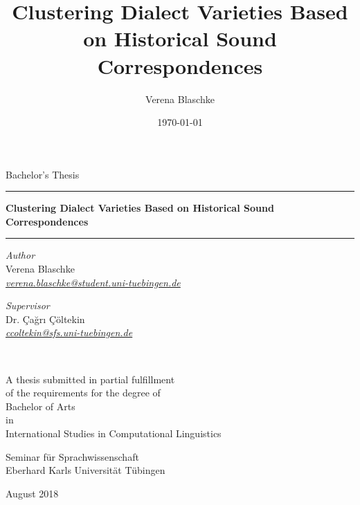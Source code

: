 \documentclass[a4paper]{article}
\title{Clustering Dialect Varieties Based on Historical Sound Correspondences}
\author{Verena Blaschke}
\date{\today}
\begin{document}
\begin{titlepage}
\begin{center}

\vspace*{.15\textheight}

{\Large Bachelor's Thesis}
\vspace{2em}

\hrule
\vspace{0.6cm}
{\huge\bfseries
Clustering Dialect Varieties Based on Historical Sound Correspondences
}\\[0.7cm] 
\hrule
\vspace*{.05\textheight}
 
\begin{minipage}[t]{0.4\textwidth}
\begin{flushleft} 
{\large
\textit{Author}\\
Verena Blaschke}\\
\href{mailto:verena.blaschke@student.uni-tuebingen.de}{\textit{verena.blaschke@student.uni-tuebingen.de}}\\
\end{flushleft}
\end{minipage}
\begin{minipage}[t]{0.4\textwidth}
\begin{flushright}
{\large
\textit{Supervisor}\\
Dr. Çağrı Çöltekin}\\
\href{mailto:ccoltekin@sfs.uni-tuebingen.de}{\textit{ccoltekin@sfs.uni-tuebingen.de}}\\
\end{flushright}
\end{minipage}\\

\vfill

A thesis submitted in partial fulfillment\\
of the requirements for the degree of\\[2mm]
{\large Bachelor of Arts}\\
in\\[1mm]
{\large International Studies in Computational Linguistics}

\vspace*{.1\textheight}

{\large Seminar für Sprachwissenschaft\\
Eberhard Karls Universität Tübingen

\vspace{1em}
August 2018}
\end{center}
    
\end{titlepage}
\end{document}
